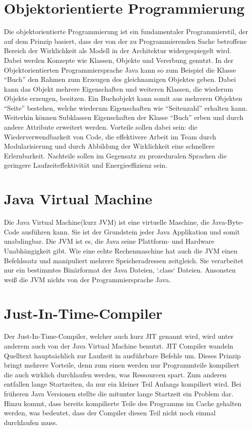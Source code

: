 \section{Objektorientierte Programmierung}
\label{sec:OO}
Die objektorientierte Programmierung ist ein fundamentaler Programmierstil, der
auf dem Prinzip basiert, dass der von der zu Programmierenden Sache betroffene
Bereich der Wirklichkeit als Modell in der Architektur widergespiegelt wird.
Dabei werden Konzepte wie Klassen, Objekte und Vererbung genutzt.
In der Objektorientierten Programmiersprache Java kann so zum Beispiel die
Klasse "`Buch"' den Rahmen zum Erzeugen des gleichnamigen Objektes geben. Dabei
kann das Objekt mehrere Eigenschaften und weiteren Klassen, die
wiederum Objekte erzeugen, besitzen. Ein Buchobjekt kann somit aus mehreren
Objekten "`Seite"' bestehen, welche wiederum Eigenschaften wie "`Seitenzahl"'
erhalten kann. Weiterhin können Subklassen Eigenschaften der Klasse "`Buch"'
erben und durch andere Attribute erweitert werden.
Vorteile sollen dabei sein: die Wiederverwendbarkeit von Code, die effektivere
Arbeit im Team durch Modularisierung und durch Abbildung der Wirklichkeit eine
schnellere Erlernbarkeit. Nachteile sollen im Gegensatz zu prozeduralen Sprachen
die geringere Laufzeiteffektivität und Energieeffizienz sein.

\section{Java Virtual Machine}
\label{sec:JVM}
Die Java Virtual Machine(kurz JVM) ist eine virtuelle Maschine, die
Java-Byte-Code ausführen kann. Sie ist der Grundstein jeder Java Applikation und
somit unabdingbar. Die JVM ist es, die Java seine Plattform- und Hardware
Unabhängigkeit gibt. Wie eine echte Rechenmaschine hat auch die JVM einen Befehlssatz und
manipuliert mehrere Speicheradressen zeitgleich. Sie verarbeitet nur ein
bestimmtes Binärformat der Java Dateien, `.class` Dateien. Ansonsten weiß die
JVM nichts von der Programmiersprache Java.

\section{Just-In-Time-Compiler}
\label{sec:JIT}
Der Just-In-Time-Compiler, welcher auch kurz JIT genannt wird, wird unter
anderem auch von der Java Virtual Machine benutzt. JIT Compiler wandeln 
Quelltext hauptsächlich zur Laufzeit in ausführbare Befehle um. Dieses Prinzip
bringt mehrere Vorteile, denn zum einen werden nur Programmteile kompiliert die
auch wirklich durchlaufen werden, was Ressourcen spart. Zum anderen entfallen
lange Startzeiten, da nur ein kleiner Teil Anfangs kompiliert wird. Bei früheren
Java Versionen stellte die mitunter lange Startzeit ein Problem dar. Hinzu
kommt, dass bereits kompilierte Teile des Programms im Cache gehalten werden,
was bedeutet, dass der Compiler diesen Teil nicht noch einmal durchlaufen muss.

